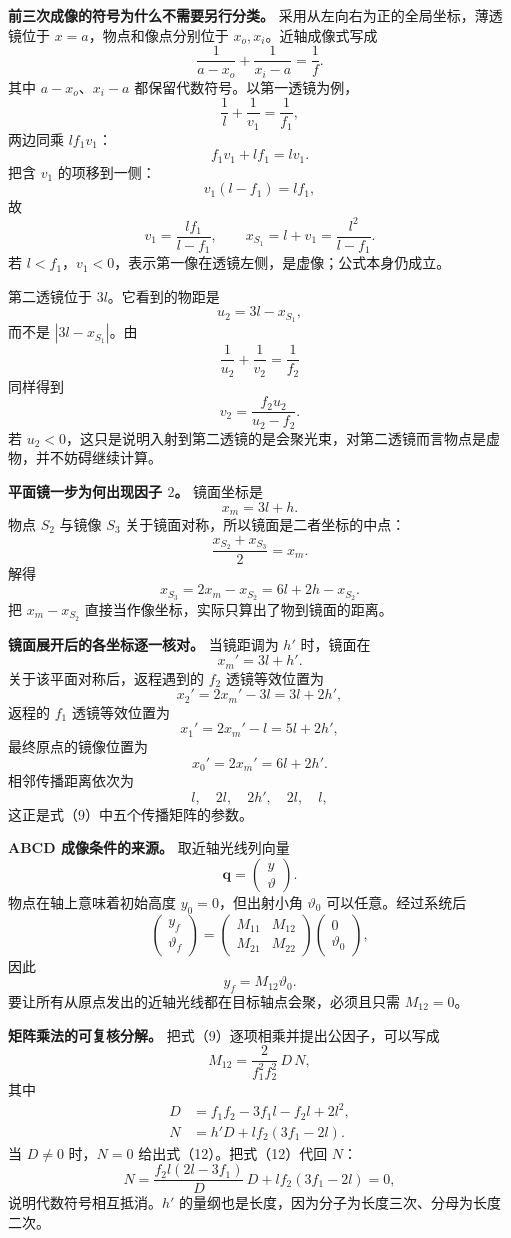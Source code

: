 \documentclass[12pt,a4paper,UTF8]{ctexart}
\begin{document}
\textbf{前三次成像的符号为什么不需要另行分类。}
采用从左向右为正的全局坐标，薄透镜位于 \(x=a\)，物点和像点分别位于
\(x_o,x_i\)。近轴成像式写成 \[
\frac1{a-x_o}+\frac1{x_i-a}=\frac1f.
\] 其中 \(a-x_o\)、\(x_i-a\) 都保留代数符号。以第一透镜为例， \[
\frac1l+\frac1{v_1}=\frac1{f_1},
\] 两边同乘 \(lf_1v_1\)： \[
f_1v_1+lf_1=lv_1.
\] 把含 \(v_1\) 的项移到一侧： \[
v_1(l-f_1)=lf_1,
\] 故 \[
v_1=\frac{lf_1}{l-f_1},
\qquad
x_{S_1}=l+v_1=\frac{l^2}{l-f_1}.
\] 若
\(l<f_1\)，\(v_1<0\)，表示第一像在透镜左侧，是虚像；公式本身仍成立。

第二透镜位于 \(3l\)。它看到的物距是 \[
u_2=3l-x_{S_1},
\] 而不是 \(|3l-x_{S_1}|\)。由 \[
\frac1{u_2}+\frac1{v_2}=\frac1{f_2}
\] 同样得到 \[
v_2=\frac{f_2u_2}{u_2-f_2}.
\] 若
\(u_2<0\)，这只是说明入射到第二透镜的是会聚光束，对第二透镜而言物点是虚物，并不妨碍继续计算。

\textbf{平面镜一步为何出现因子 \(2\)。} 镜面坐标是 \[
x_m=3l+h.
\] 物点 \(S_2\) 与镜像 \(S_3\) 关于镜面对称，所以镜面是二者坐标的中点：
\[
\frac{x_{S_2}+x_{S_3}}2=x_m.
\] 解得 \[
x_{S_3}=2x_m-x_{S_2}=6l+2h-x_{S_2}.
\] 把 \(x_m-x_{S_2}\) 直接当作像坐标，实际只算出了物到镜面的距离。

\textbf{镜面展开后的各坐标逐一核对。} 当镜距调为 \(h'\) 时，镜面在 \[
x_m'=3l+h'.
\] 关于该平面对称后，返程遇到的 \(f_2\) 透镜等效位置为 \[
x_2'=2x_m'-3l=3l+2h',
\] 返程的 \(f_1\) 透镜等效位置为 \[
x_1'=2x_m'-l=5l+2h',
\] 最终原点的镜像位置为 \[
x_0'=2x_m'=6l+2h'.
\] 相邻传播距离依次为 \[
l,\quad2l,\quad2h',\quad2l,\quad l,
\] 这正是式（9）中五个传播矩阵的参数。

\textbf{ABCD 成像条件的来源。} 取近轴光线列向量 \[
\boldsymbol q=\begin{pmatrix}y\\ \vartheta\end{pmatrix}.
\] 物点在轴上意味着初始高度 \(y_0=0\)，但出射小角 \(\vartheta_0\)
可以任意。经过系统后 \[
\begin{pmatrix}y_f\\ \vartheta_f\end{pmatrix}
=
\begin{pmatrix}M_{11}&M_{12}\\M_{21}&M_{22}\end{pmatrix}
\begin{pmatrix}0\\ \vartheta_0\end{pmatrix},
\] 因此 \[
y_f=M_{12}\vartheta_0.
\] 要让所有从原点发出的近轴光线都在目标轴点会聚，必须且只需
\(M_{12}=0\)。

\textbf{矩阵乘法的可复核分解。} 把式（9）逐项相乘并提出公因子，可以写成
\[
M_{12}=\frac{2}{f_1^2f_2^2}\,D\,N,
\] 其中 \[
\begin{aligned}
D&=f_1f_2-3f_1l-f_2l+2l^2,\\
N&=h'D+l f_2(3f_1-2l).
\end{aligned}
\] 当 \(D\ne0\) 时，\(N=0\) 给出式（12）。把式（12）代回 \(N\)： \[
N=
\frac{f_2l(2l-3f_1)}D\,D
+lf_2(3f_1-2l)=0,
\] 说明代数符号相互抵消。\(h'\)
的量纲也是长度，因为分子为长度三次、分母为长度二次。
\end{document}
